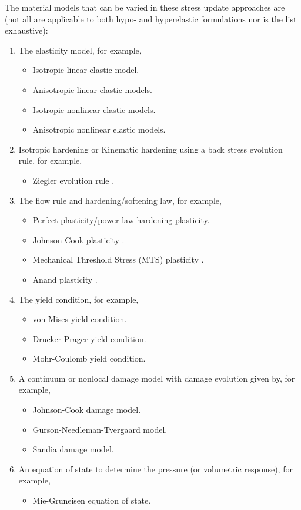 The material models that can be varied in these stress update approaches
are (not all are applicable to both hypo- and hyperelastic formulations
nor is the list exhaustive):
\begin{enumerate}
    \item The elasticity model, for example, 
      \begin{itemize}
        \item Isotropic linear elastic model. 
        \item Anisotropic linear elastic models.
        \item Isotropic nonlinear elastic models.
        \item Anisotropic nonlinear elastic models.
      \end{itemize}
    \item Isotropic hardening or Kinematic hardening using a 
          back stress evolution rule, for example,
      \begin{itemize}
        \item Ziegler evolution rule   .
      \end{itemize}
    \item The flow rule and hardening/softening law, for example,
      \begin{itemize} 
        \item Perfect plasticity/power law hardening plasticity.
        \item Johnson-Cook plasticity .
        \item Mechanical Threshold Stress (MTS) plasticity .
        \item Anand plasticity .
      \end{itemize} 
    \item The yield condition, for example,
      \begin{itemize} 
        \item von Mises yield condition.
        \item Drucker-Prager yield condition.
        \item Mohr-Coulomb yield condition.
      \end{itemize} 
    \item A continuum or nonlocal damage model with damage evolution
          given by, for example, 
      \begin{itemize}
        \item Johnson-Cook damage model.
        \item Gurson-Needleman-Tvergaard model.
        \item Sandia damage model.
      \end{itemize}
    \item An equation of state to determine the pressure (or 
          volumetric response), for example, 
      \begin{itemize}
        \item Mie-Gruneisen equation of state.
      \end{itemize}
\end{enumerate}
  
